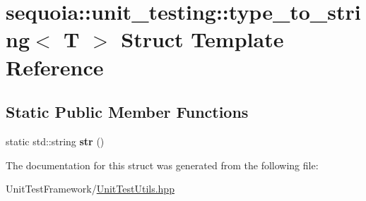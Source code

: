 \hypertarget{structsequoia_1_1unit__testing_1_1type__to__string}{}\section{sequoia\+::unit\+\_\+testing\+::type\+\_\+to\+\_\+string$<$ T $>$ Struct Template Reference}
\label{structsequoia_1_1unit__testing_1_1type__to__string}
\subsection*{Static Public Member Functions}
\begin{DoxyCompactItemize}
\item 
\mbox{\label{structsequoia_1_1unit__testing_1_1type__to__string_af95ab45815206e9384abb4e86c7e45a9}} 
static std\+::string {\bfseries str} ()
\end{DoxyCompactItemize}


The documentation for this struct was generated from the following file\+:\begin{DoxyCompactItemize}
\item 
Unit\+Test\+Framework/\mbox{\hyperlink{_unit_test_utils_8hpp}{Unit\+Test\+Utils.\+hpp}}\end{DoxyCompactItemize}
